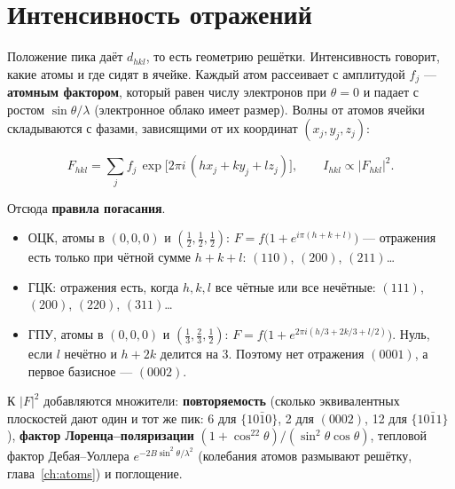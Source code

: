 \section{Интенсивность отражений}

Положение пика даёт $d_{hkl}$, то есть геометрию решётки. Интенсивность говорит, какие атомы и где сидят в ячейке.
Каждый атом рассеивает с амплитудой $f_j$ --- \textbf{атомным фактором}, который равен числу электронов при
$\theta = 0$ и падает с ростом $\sin\theta/\lambda$ (электронное облако имеет размер). Волны от атомов ячейки
складываются с фазами, зависящими от их координат $(x_j, y_j, z_j)$:
\begin{keyf}
\[
F_{hkl} = \sum_j f_j\,\exp\bigl[2\pi i\,(hx_j + ky_j + lz_j)\bigr],\qquad I_{hkl}\propto|F_{hkl}|^2 .
\]
\end{keyf}
Отсюда \textbf{правила погасания}.
\begin{itemize}
\item ОЦК, атомы в $(0,0,0)$ и $(\tfrac12,\tfrac12,\tfrac12)$: $F = f\bigl(1 + e^{i\pi(h+k+l)}\bigr)$ --- отражения есть
  только при чётной сумме $h+k+l$: $(110)$, $(200)$, $(211)$\ldots
\item ГЦК: отражения есть, когда $h, k, l$ все чётные или все нечётные: $(111)$, $(200)$, $(220)$, $(311)$\ldots
\item ГПУ, атомы в $(0,0,0)$ и $(\tfrac13,\tfrac23,\tfrac12)$: $F = f\bigl(1 + e^{2\pi i(h/3 + 2k/3 + l/2)}\bigr)$. Нуль,
  если $l$ нечётно и $h+2k$ делится на 3. Поэтому нет отражения $(0001)$, а первое базисное --- $(0002)$.
\end{itemize}
К $|F|^2$ добавляются множители: \textbf{повторяемость} (сколько эквивалентных плоскостей дают один и тот же пик:
6 для $\{10\bar10\}$, 2 для $(0002)$, 12 для $\{10\bar11\}$), \textbf{фактор Лоренца--поляризации}
$(1+\cos^22\theta)/(\sin^2\theta\cos\theta)$, тепловой фактор Дебая--Уоллера $e^{-2B\sin^2\theta/\lambda^2}$ (колебания
атомов размывают решётку, глава~\ref{ch:atoms}) и поглощение.


